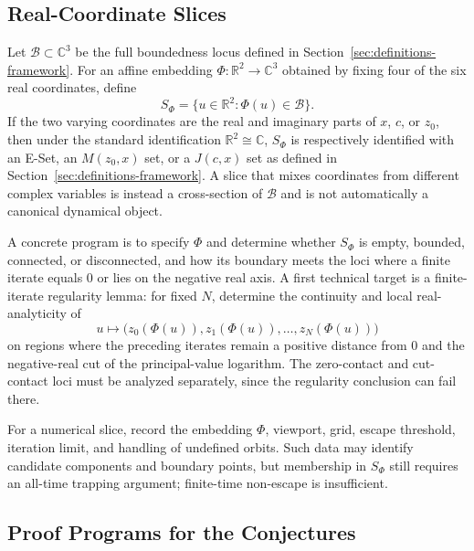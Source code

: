 \documentclass[12pt,a4paper]{amsart}
\theoremstyle{remark}
\newcommand{\C}{\mathbb{C}}
\newcommand{\R}{\mathbb{R}}
\begin{document}
\subsection{Real-Coordinate Slices}

Let $\mathcal{B}\subset\C^3$ be the full boundedness locus defined in
Section~\ref{sec:definitions-framework}.
For an affine embedding $\Phi:\R^2\to\C^3$ obtained by fixing four of the six
real coordinates, define
\[
S_{\Phi}=\{u\in\R^2:\Phi(u)\in\mathcal{B}\}.
\]
If the two varying coordinates are the real and imaginary parts of $x$, $c$,
or $z_0$, then under the standard identification $\R^2\cong\C$, $S_{\Phi}$ is
respectively identified with an E-Set, an $M(z_0,x)$ set, or a $J(c,x)$ set as
defined in Section~\ref{sec:definitions-framework}. A slice that mixes
coordinates from different complex variables is instead a cross-section of
$\mathcal{B}$ and is not automatically a canonical dynamical object.

A concrete program is to specify $\Phi$ and determine whether $S_{\Phi}$ is
empty, bounded, connected, or disconnected, and how its boundary meets the loci
where a finite iterate equals $0$ or lies on the negative real axis. A first
technical target is a finite-iterate regularity lemma: for fixed $N$, determine
the continuity and local real-analyticity of
\[
u\longmapsto
\bigl(z_0(\Phi(u)),z_1(\Phi(u)),\ldots,z_N(\Phi(u))\bigr)
\]
on regions where the preceding iterates remain a positive distance from $0$
and the negative-real cut of the principal-value logarithm. The zero-contact
and cut-contact loci must be
analyzed separately, since the regularity conclusion can fail there.

For a numerical slice, record the embedding $\Phi$, viewport, grid, escape threshold,
iteration limit, and handling of undefined orbits. Such
data may identify candidate components and boundary points, but membership in
$S_{\Phi}$ still requires an all-time trapping argument; finite-time
non-escape is insufficient.

\subsection{Proof Programs for the Conjectures}
\end{document}
